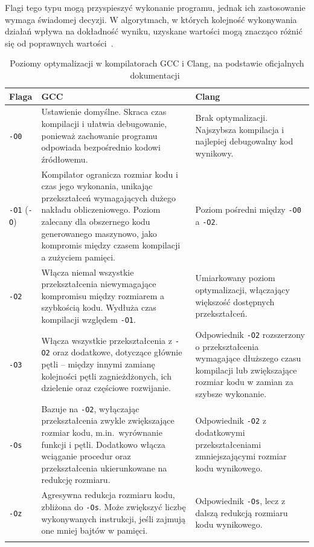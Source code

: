 Flagi tego typu mogą przyspieszyć wykonanie programu, jednak ich zastosowanie wymaga świadomej decyzji. W algorytmach, w których kolejność wykonywania działań wpływa na dokładność wyniku, uzyskane wartości mogą znacząco różnić się od poprawnych wartości~\cite{gcc_optlevels}.
\begin{table}[htbp]
    \centering
    \caption{Poziomy optymalizacji w kompilatorach GCC i Clang, na podstawie oficjalnych dokumentacji~\cite{gcc_optlevels,clang_cmdguide}}
    \label{tab:poziomy_optymalizacji}
    \begin{tabularx}{\textwidth}{@{} l X X @{}}
        \toprule
        \textbf{Flaga} & \textbf{GCC} & \textbf{Clang} \\
        \midrule

        \texttt{-O0} &
            Ustawienie domyślne. Skraca czas kompilacji i ułatwia debugowanie, ponieważ zachowanie programu odpowiada bezpośrednio kodowi źródłowemu. &
            Brak optymalizacji. Najszybsza kompilacja i najlepiej debugowalny kod wynikowy. \\
        \addlinespace

       \texttt{-O1} (\texttt{-O}) &
            Kompilator ogranicza rozmiar kodu i czas jego wykonania, unikając przekształceń wymagających dużego nakładu obliczeniowego. Poziom zalecany dla obszernego kodu generowanego maszynowo, jako kompromis między czasem kompilacji a zużyciem pamięci. &
            Poziom pośredni między \texttt{-O0} a \texttt{-O2}. \\
        \addlinespace

        \texttt{-O2} &
            Włącza niemal wszystkie przekształcenia niewymagające kompromisu między rozmiarem a szybkością kodu. Wydłuża czas kompilacji względem \texttt{-O1}. &
            Umiarkowany poziom optymalizacji, włączający większość dostępnych przekształceń. \\
        \addlinespace

           \texttt{-O3} &
            Włącza wszystkie przekształcenia z \texttt{-O2} oraz dodatkowe, dotyczące głównie pętli -- między innymi zamianę kolejności pętli zagnieżdżonych, ich dzielenie oraz częściowe rozwijanie. &
            Odpowiednik \texttt{-O2} rozszerzony o przekształcenia wymagające dłuższego czasu kompilacji lub zwiększające rozmiar kodu w zamian za szybsze wykonanie. \\
        \addlinespace

            \texttt{-Os} &
            Bazuje na \texttt{-O2}, wyłączając przekształcenia zwykle zwiększające rozmiar kodu, m.in.\ wyrównanie funkcji i pętli. Dodatkowo włącza wciąganie procedur oraz przekształcenia ukierunkowane na redukcję rozmiaru. &
            Odpowiednik \texttt{-O2} z dodatkowymi przekształceniami zmniejszającymi rozmiar kodu wynikowego. \\
        \addlinespace
        \texttt{-Oz} &
            Agresywna redukcja rozmiaru kodu, zbliżona do \texttt{-Os}. Może zwiększyć liczbę wykonywanych instrukcji, jeśli zajmują one mniej bajtów w pamięci. &
            Odpowiednik \texttt{-Os}, lecz z dalszą redukcją rozmiaru kodu wynikowego. \\
        \addlinespace


\end{tabularx}
\end{table}

